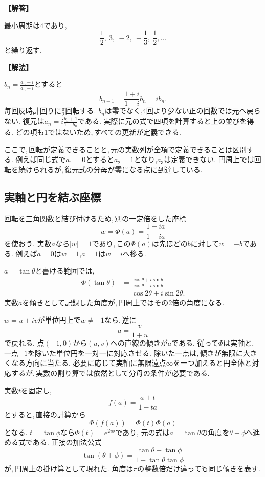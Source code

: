 \noindent\textbf{【解答】}\par\nobreak
最小周期は4であり,
\[
 \frac12,\ 3,\ -2,\ -\frac13,\ \frac12,\ldots
\]
と繰り返す.

\noindent\textbf{【解法】}\par\nobreak
$b_n=\frac{a_n-i}{a_n+i}$とすると
\[
 b_{n+1}=\frac{1+i}{1-i}b_n=ib_n.
\]
毎回反時計回りに$\frac{\pi}{2}$回転する.
$b_n$は零でなく,4回より少ない正の回数では元へ戻らない.
復元は$a_n=i\frac{b_n+1}{1-b_n}$である.
実際に元の式で四項を計算すると上の並びを得る.
どの項も1ではないため,\,すべての更新が定義できる.

ここで,\,回転が定義できることと,\,元の実数列が全項で定義できることは区別する.
例えば同じ式で$a_1=0$とすると$a_2=1$となり,$a_3$は定義できない.
円周上では回転を続けられるが,\,復元式の分母が零になる点に到達している.

\subsection{実軸と円を結ぶ座標}\label{節：実軸と円}

回転を三角関数と結び付けるため,\,別の一定倍をした座標
\[
 w=\Phi(a)=\frac{1+ia}{1-ia}
\]
を使おう.
実数$a$なら$|w|=1$であり,\,この$\Phi(a)$は先ほどの$b$に対して$w=-b$である.
例えば$a=0$は$w=1$,$a=1$は$w=i$へ移る.

$a=\tan\theta$と書ける範囲では,
\[
 \begin{aligned}
 \Phi(\tan\theta)
 &=\frac{\cos\theta+i\sin\theta}{\cos\theta-i\sin\theta}\\
 &=\cos2\theta+i\sin2\theta.
 \end{aligned}
\]
実数$a$を傾きとして記録した角度が,\,円周上ではその2倍の角度になる.
\NewFigCayley

$w=u+iv$が単位円上で$w\ne-1$なら,\,逆に
\[
 a=\frac{v}{1+u}
\]
で戻れる.
点$(-1,0)$から$(u,v)$への直線の傾きが$a$である.
従って$\Phi$は実軸と,\,一点$-1$を除いた単位円を一対一に対応させる.
除いた一点は,\,傾きが無限に大きくなる方向に当たる.
必要に応じて実軸に無限遠点$\infty$を一つ加えると円全体と対応するが,\,実数の割り算では依然として分母の条件が必要である.

実数$t$を固定し,
\[
 f(a)=\frac{a+t}{1-ta}
\]
とすると,\,直接の計算から
\[
 \Phi(f(a))=\Phi(t)\Phi(a)
\]
となる. $t=\tan\phi$なら$\Phi(t)=e^{2i\phi}$であり,
元の式は$a=\tan\theta$の角度を$\theta+\phi$へ進める式である.
正接の加法公式
\[
 \tan(\theta+\phi)
 =\frac{\tan\theta+\tan\phi}{1-\tan\theta\tan\phi}
\]
が,\,円周上の掛け算として現れた.
角度は$\pi$の整数倍だけ違っても同じ傾きを表す.

